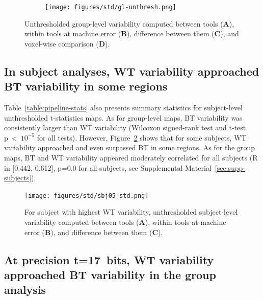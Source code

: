 \documentclass[11pt,onecolumn]{article}
\begin{document}
{\begin{figure}[ht]
  \centering
  \begin{subfigure}[ht]{0.9\textwidth}
    \centering
    \texttt{[image: figures/std/gl-unthresh.png]}
  \end{subfigure}
  \caption{Unthresholded group-level variability computed between tools
    (\textbf{A}), within tools at machine error (\textbf{B}), difference
    between them (\textbf{C}), and voxel-wise comparison (\textbf{D}). }
  \label{fig:unthresh-maps}
\end{figure}

\subsection{In subject analyses, WT variability approached BT variability in some regions}

Table~\ref{table:pipeline-stats} also presents summary statistics for
subject-level unthresholded t-statistics maps. As for group-level maps,
BT variability was consistently larger than WT variability (Wilcoxon
signed-rank test and t-test p~\textless~$10^{-5}$ for all tests).
However, Figure~\ref{fig:unthresh-maps-sbj} shows that for
some subjects, WT variability approached and even
surpassed BT in some regions. As for the group maps, BT and WT
variability appeared moderately correlated for all subjects (R in [0.442,
    0.612], p=0.0 for all subjects, see Supplemental Material~\ref{sec:supp-subjects}).

\begin{figure}[ht]
  \centering
  \texttt{[image: figures/std/sbj05-std.png]}
  \caption{For subject with highest WT variability,
    unthresholded subject-level variability computed between tools (\textbf{A}), within tools at machine error (\textbf{B}),
    and difference between them (\textbf{C}). }
  \label{fig:unthresh-maps-sbj}
\end{figure}

\subsection{At precision t=17~bits, WT variability approached BT variability in the group analysis}

}
\end{document}
